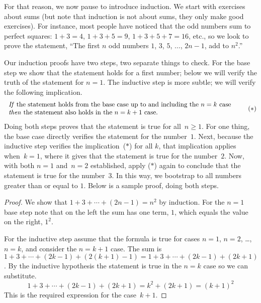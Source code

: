 \documentclass{ibl}
\begin{document}
For that reason, we now pause to introduce induction.
We start with exercises about sums 
(but note that induction is not about sums,
they only make good exercises).
For instance, most people have noticed that the odd numbers sum to 
perfect squares: $1+3=4$, $1+3+5=9$, $1+3+5+7=16$, etc.,
so we look to prove 
the statement, 
``The first $n$ odd numbers $1$, $3$, $5$, $\ldots$, $2n-1$, add to $n^2$.'' 

Our induction proofs have two steps, two separate things to check.
For the base step we show that the statement holds for a first number;
below we will verify the truth of the statement for $n=1$.
The inductive step is more subtle;
we will verify the following implication.
\begin{equation*}
  \begin{tabular}{l} 
  \textit{If} the statement holds from the base case up to and including 
   the $n=k$ case \\
  \textit{then} the statement also holds in the~$n=k+1$ case.
  \end{tabular}
  \tag{$*$}
\end{equation*}
Doing both steps  
proves that the statement is true for all~$n\geq 1$.
For one thing, the base case    
directly verifies the statement for the number~$1$.
Next, because the inductive step verifies the implication~($*$) for all $k$, 
that implication applies when~$k=1$, where it gives 
that the statement is true for the number~$2$. 
Now, with both $n=1$ and~$n=2$ established, 
apply ($*$) again to conclude that the statement is true for the number~$3$.
In this way, we bootstrap to all numbers greater than or equal to $1$.
Below is a sample proof, doing both steps.

\begin{proof}
  We show that $1+3+\cdots+(2n-1)=n^2$ by induction.
  For the $n=1$ base step note that on the left the sum has one term, $1$,
  which equals the value on the right, $1^2$.

  For the inductive step assume that the 
  formula is true for cases $n=1$, $n=2$, \ldots, $n=k$, and 
  consider the $n=k+1$ case.
  The sum is $1+3+\cdots+(2k-1)+(2(k+1)-1)=1+3+\cdots+(2k-1)+(2k+1)$.
  By the inductive hypothesis the statement is true in the $n=k$ case
  so we can substitute.
  \begin{equation*}
    1+3+\cdots+(2k-1)+(2k+1)=k^2+(2k+1)=(k+1)^2
  \end{equation*}
  This is the required expression for the case~$k+1$.
\end{proof}
\end{document}
